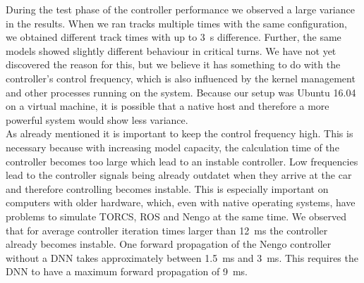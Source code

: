 \documentclass[10pt,a4paper,twoside,journal]{IEEEtran}
\begin{document}
During the test phase of the controller performance we observed a large variance in the results. When we ran tracks multiple times with the same configuration, we obtained different track times with up to \SI{3}{\second} difference. Further, the same models showed slightly different behaviour in critical turns. We have not yet discovered the reason for this, but we believe it has something to do with the controller's control frequency, which is also influenced by the kernel management and other processes running on the system. Because our setup was Ubuntu 16.04 on a virtual machine, it is possible that a native host and therefore a more powerful system would show less variance. \\
%
%
As already mentioned it is important to keep the control frequency high. This is necessary because with increasing model capacity, the calculation time of the controller becomes too large which lead to an instable controller. Low frequencies lead to the controller signals being already outdatet when they arrive at the car and therefore controlling becomes instable. This is especially important on computers with older hardware, which, even with native operating systems, have problems to simulate TORCS, ROS and Nengo at the same time. We observed that for average controller iteration times larger than \SI{12}{\milli\second} the controller already becomes instable. One forward propagation of the Nengo controller without a DNN takes approximately between \SI{1.5}{\milli\second} and \SI{3}{\milli\second}. This requires the DNN to have a maximum forward propagation of \SI{9}{\milli\second}. \\
\end{document}
